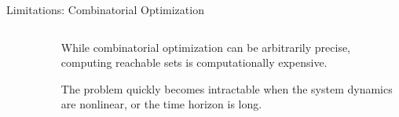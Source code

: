 \begin{frame}[fragile]{Limitations: Combinatorial Optimization}
\begin{columns}
\begin{column}{0.4\textwidth}
\begin{figure}
{\begin{tikzpicture}
                    \end{tikzpicture}
                }
            \end{figure}
        \end{column}
        \begin{column}{0.6\textwidth}
            While combinatorial optimization can be arbitrarily precise, computing reachable sets is computationally expensive.
            
            \vspace{0.5cm}

            The problem quickly becomes intractable when the system dynamics are nonlinear, or the time horizon is long.
        \end{column}
    \end{columns}
\end{frame}